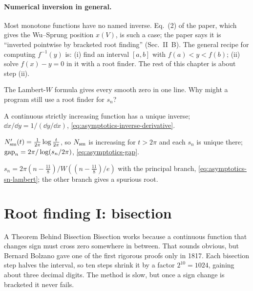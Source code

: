 \paragraph{Numerical inversion in general.} Most monotone functions have no named inverse. Eq.~(2) of the paper, which gives the Wu--Sprung position $x(V)$, is such a case; the paper says it is ``inverted pointwise by bracketed root finding'' (Sec.~II~B). The general recipe for computing $f^{-1}(y)$ is: (i) find an interval $[a,b]$ with $f(a)<y<f(b)$; (ii) solve $f(x)-y=0$ in it with a root finder. The rest of this chapter is about step (ii).

\begin{checkpoint}
The Lambert-$W$ formula gives every smooth zero in one line. Why might a program still use a root finder for $s_n$?
\end{checkpoint}

\begin{keyideas}
\item A continuous strictly increasing function has a unique inverse; $\dd x/\dd y=1/(\dd y/\dd x)$, \cref{eq:asymptotics-inverse-derivative}.
\item $N_{\mathrm{sm}}'(t)=\frac{1}{2\pi}\log\frac{t}{2\pi}$, so $N_{\mathrm{sm}}$ is increasing for $t>2\pi$ and each $s_n$ is unique there; $\mathrm{gap}_n=2\pi/\log(s_n/2\pi)$, \cref{eq:asymptotics-gap}.
\item $s_n=2\pi(n-\frac{11}8)/W((n-\frac{11}8)/e)$ with the principal branch, \cref{eq:asymptotics-sn-lambert}; the other branch gives a spurious root.
\end{keyideas}

\section{Root finding I: bisection}\label{sec:asymptotics-bisection}
\begin{didyouknow}{A Theorem Behind Bisection}
Bisection works because a continuous function that changes sign must cross zero somewhere in between. That sounds obvious, but Bernard Bolzano gave one of the first rigorous proofs only in 1817. Each bisection step halves the interval, so ten steps shrink it by a factor $2^{10}=1024$, gaining about three decimal digits. The method is slow, but once a sign change is bracketed it never fails.
\end{didyouknow}

